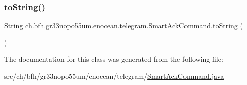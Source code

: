 \hypertarget{classch_1_1bfh_1_1gr33nopo55um_1_1enocean_1_1telegram_1_1_smart_ack_command_a5f55a2d85825726777f32021c2595d9c}{}\label{classch_1_1bfh_1_1gr33nopo55um_1_1enocean_1_1telegram_1_1_smart_ack_command_a5f55a2d85825726777f32021c2595d9c} 
\subsubsection{\texorpdfstring{to\+String()}{toString()}}
{\footnotesize\ttfamily String ch.\+bfh.\+gr33nopo55um.\+enocean.\+telegram.\+Smart\+Ack\+Command.\+to\+String (\begin{DoxyParamCaption}{ }\end{DoxyParamCaption})}



The documentation for this class was generated from the following file\+:\begin{DoxyCompactItemize}
\item 
src/ch/bfh/gr33nopo55um/enocean/telegram/\hyperlink{_smart_ack_command_8java}{Smart\+Ack\+Command.\+java}\end{DoxyCompactItemize}
